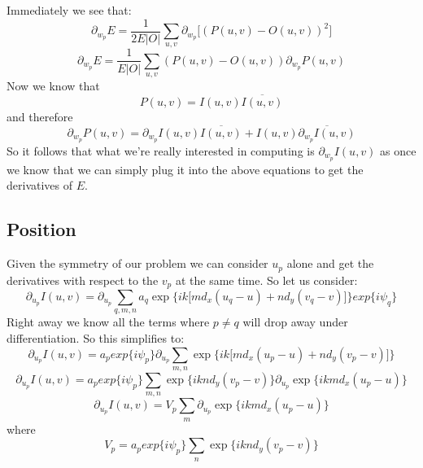 \documentclass[10pt,a5paper]{book}
\begin{document}
Immediately we see that:
\begin{equation}
\partial_{w_p}E=\frac{1}{2E|O|}\sum_{u,v}\partial_{w_p}\lbrack(P(u,v) - O(u,v))^2\rbrack
\end{equation}
\begin{equation}
\partial_{w_p}E=\frac{1}{E|O|}\sum_{u,v}(P(u,v) - O(u,v))\partial_{w_p}P(u,v)
\end{equation}
Now we know that
\begin{equation}
P(u,v)=I(u,v)\overline{I(u,v)}
\end{equation}
and therefore
\begin{equation}
\partial_{w_p}P(u,v)=\partial_{w_p}I(u,v)\overline{I(u,v)}+I(u,v)\overline{\partial_{w_p}I(u,v)}
\end{equation}
So it follows that what we're really interested in computing is $\partial_{w_p}I(u,v)$ as once we know that we can simply plug it into the above equations to get the derivatives of $E$.

\subsection{Position}
Given the symmetry of our problem we can consider $u_p$ alone and get the derivatives with respect to the $v_p$ at the same time. So let us consider:
\begin{equation}
\partial_{u_p}I(u, v) = \partial_{u_p}\sum_{q,m,n}a_q\exp\lbrace ik \lbrack md_x(u_q-u)+nd_y(v_q-v)\rbrack\rbrace exp\lbrace i\psi_q \rbrace
\end{equation}
Right away we know all the terms where $p\neq q$ will drop away under differentiation. So this simplifies to:
\begin{equation}
\partial_{u_p}I(u, v) = a_p exp\lbrace i\psi_p \rbrace \partial_{u_p}\sum_{m,n}\exp\lbrace ik \lbrack md_x(u_p-u)+nd_y(v_p-v)\rbrack\rbrace 
\end{equation}
\begin{equation}
\partial_{u_p}I(u, v) = a_p exp\lbrace i\psi_p \rbrace \sum_{m,n} \exp\lbrace iknd_y(v_p-v)\rbrace \partial_{u_p}\exp\lbrace ikmd_x(u_p-u)\rbrace  
\end{equation}
\begin{equation}
\partial_{u_p}I(u, v) =V_p\sum_{m}\partial_{u_p}\exp\lbrace ikmd_x(u_p-u)\rbrace  
\end{equation}
where
\begin{equation}
V_p = a_p exp\lbrace i\psi_p \rbrace \sum_{n} \exp\lbrace iknd_y(v_p-v)\rbrace
\end{equation}
\end{document}
